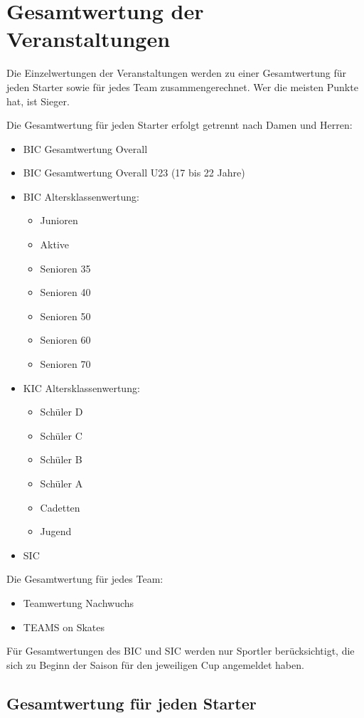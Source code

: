 \section{Gesamtwertung der Veranstaltungen}
Die Einzelwertungen der Veranstaltungen werden zu einer Gesamtwertung für jeden Starter sowie für jedes Team zusammengerechnet. Wer die meisten Punkte hat, ist Sieger.

Die Gesamtwertung für jeden Starter erfolgt getrennt nach Damen und Herren:
\begin{itemize}
	\item BIC Gesamtwertung Overall
	\item BIC Gesamtwertung Overall U23 (17 bis 22 Jahre)
	\item BIC Altersklassenwertung:
	\begin{itemize}
		\item Junioren
		\item Aktive
		\item Senioren 35
		\item Senioren 40
		\item Senioren 50
		\item Senioren 60
		\item Senioren 70
	\end{itemize}
	\item KIC Altersklassenwertung:
	\begin{itemize}
		\item Schüler D
		\item Schüler C
		\item Schüler B
		\item Schüler A
		\item Cadetten
		\item Jugend
	\end{itemize}
	\item SIC
\end{itemize}

Die Gesamtwertung für jedes Team:
\begin{itemize}
	\item Teamwertung Nachwuchs
	\item TEAMS on Skates
\end{itemize}

Für Gesamtwertungen des BIC und SIC werden nur Sportler berücksichtigt, die sich zu Beginn der Saison für den jeweiligen Cup angemeldet haben.

\subsection{Gesamtwertung für jeden Starter}

